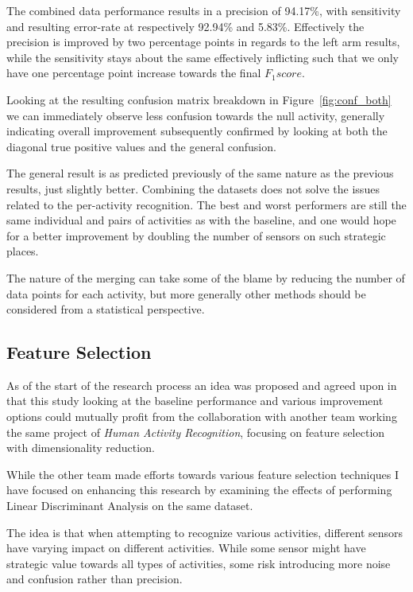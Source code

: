 \documentclass{sig-alternate}
\begin{document}
The combined data performance results in a precision of 94.17\%, with sensitivity and resulting error-rate at respectively 92.94\% and 5.83\%. Effectively the precision is improved by two percentage points in regards to the left arm results, while the sensitivity stays about the same effectively inflicting such that we only have one percentage point increase towards the final $F_1 score$.

Looking at the resulting confusion matrix breakdown in Figure~\ref{fig:conf_both} we can immediately observe less confusion towards the null activity, generally indicating overall improvement subsequently confirmed by looking at both the diagonal true positive values and the general confusion.

The general result is as predicted previously of the same nature as the previous results, just slightly better. Combining the datasets does not solve the issues related to the per-activity recognition. The best and worst performers are still the same individual and pairs of activities as with the baseline, and one would hope for a better improvement by doubling the number of sensors on such strategic places.

The nature of the merging can take some of the blame by reducing the number of data points for each activity, but more generally other methods should be considered from a statistical perspective.

\subsection{Feature Selection}
As of the start of the research process an idea was proposed and agreed upon in that this study looking at the baseline performance and various improvement options could mutually profit from the collaboration with another team working the same project of \textit{Human Activity Recognition}, focusing on feature selection with dimensionality reduction.

While the other team made efforts towards various feature selection techniques I have focused on enhancing this research by examining the effects of performing Linear Discriminant Analysis on the same dataset.

The idea is that when attempting to recognize various activities, different sensors have varying impact on different activities. While some sensor might have strategic value towards all types of activities, some risk introducing more noise and confusion rather than precision.
\end{document}
